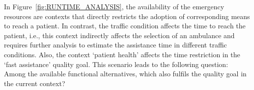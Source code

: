 In Figure~\ref{fig:RUNTIME_ANALYSIS}, the availability of the emergency resources are contexts that directly restricts the adoption of corresponding means to reach a patient. In contrast, the traffic condition affects the time to reach the patient, i.e., this context indirectly affects the selection of an ambulance and requires further analysis to estimate the assistance time in different traffic conditions. Also, the context `patient health' affects the time restriction in the `fast assistance' quality goal. This scenario leads to the following question: Among the available functional alternatives, which also fulfils the quality goal in the current context?




%
%
%
%
%
%
%
%

